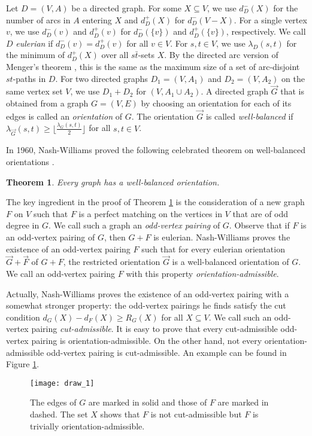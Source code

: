 \documentclass[a4paper,12pt,makeidx]{article}
\newtheorem{theo}{Theorem}
\begin{document}
Let $D=(V,A)$ be a directed graph. For some $X \subseteq V$, we use  $d_D^-(X)$ for the number of arcs in $A$ entering $X$ and  $d_D^+(X)$ for $d_D^-(V-X)$. For a single vertex $v$, we use $d^-_D(v)$ and $d^+_D(v)$ for $d_D^-(\{v\})$ and $d_D^+(\{v\})$, respectively. We call $D$ {\it eulerian} if $d^-_D(v)=d_D^+(v)$ for all $v \in V$. For $s,t \in V$, we use  $\lambda_D(s,t)$ for the minimum of $d_D^+(X)$ over all $s\bar{t}$-sets $X$. By the directed arc version of Menger's theorem \cite{m}, this is the same as the maximum size of a set of arc-disjoint $st$-paths in $D$.  For two directed graphs $D_1=(V,A_1)$ and $D_2=(V,A_2)$ on the same vertex set $V$, we use $D_1+D_2$ for $(V,A_1\cup A_2)$. A directed graph $\vec{G}$ that is obtained from a graph $G=(V,E)$ by choosing an orientation for each of its edges is called an {\it orientation} of $G$. The orientation $\vec{G}$ is called {\it well-balanced} if $\lambda_{\vec{G}}(s,t)\geq \lfloor\frac{\lambda_G(s,t)}{2}\rfloor$ for all $s,t \in V$.
\medskip

In 1960, Nash-Williams proved the following celebrated theorem on well-balanced orientations \cite{NW}. 
\begin{theo}\label{well}
Every graph has a well-balanced orientation.
\end{theo}

The key ingredient in the proof of Theorem \ref{well} is the consideration of a new graph $F$ on $V$ such that $F$ is a perfect matching on the vertices in $V$ that are of odd degree in $G$. We call such a graph an {\it odd-vertex pairing} of $G$. Observe that if $F$ is an odd-vertex pairing of $G$, then $G+F$ is eulerian. Nash-Williams proves the existence of an odd-vertex pairing $F$ such that for every eulerian orientation $\vec{G}+\vec{F}$ of $G+F$, the restricted orientation $\vec{G}$ is a well-balanced orientation of $G$. We call an odd-vertex pairing $F$ with this property {\it orientation-admissible}. 

Actually, Nash-Williams proves the existence of an odd-vertex pairing with a somewhat stronger property: the odd-vertex pairings he finds satisfy the cut condition $d_G(X)-d_F(X)\geq R_G(X)$ for all $X \subseteq V$. We call such an odd-vertex pairing {\it cut-admissible}. It is easy to prove that every cut-admissible odd-vertex pairing is orientation-admissible. On the other hand, not every orientation-admissible odd-vertex pairing is cut-admissible. An example can be found in Figure \ref{draw1}.%

 \begin{figure}[h]
        \centerline{\texttt{[image: draw\_1]}}
        \caption{The edges of $G$ are marked in solid and those of $F$ are marked in dashed. The set $X$ shows that $F$ is not cut-admissible but $F$ is trivially orientation-admissible.}
\label{draw1}
    \end{figure}
    
\end{document}
